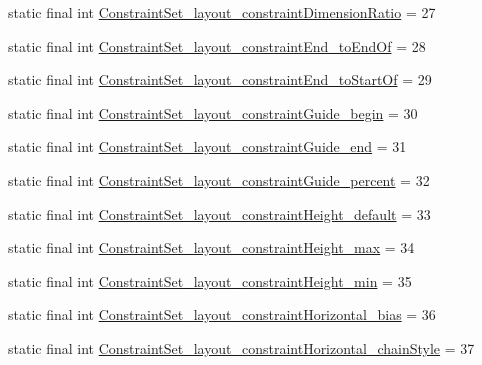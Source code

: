 \begin{DoxyCompactItemize}
\item 
static final int \mbox{\hyperlink{classandroid_1_1support_1_1constraint_1_1R_1_1styleable_a007c70f1158cd29d299c5eaf7c45eb8a}{Constraint\+Set\+\_\+layout\+\_\+constraint\+Dimension\+Ratio}} = 27
\item 
static final int \mbox{\hyperlink{classandroid_1_1support_1_1constraint_1_1R_1_1styleable_a65c534980499946880dea8ac1d597702}{Constraint\+Set\+\_\+layout\+\_\+constraint\+End\+\_\+to\+End\+Of}} = 28
\item 
static final int \mbox{\hyperlink{classandroid_1_1support_1_1constraint_1_1R_1_1styleable_a5a2dff95d8c4b48b895c5f1985dcb24c}{Constraint\+Set\+\_\+layout\+\_\+constraint\+End\+\_\+to\+Start\+Of}} = 29
\item 
static final int \mbox{\hyperlink{classandroid_1_1support_1_1constraint_1_1R_1_1styleable_a0ea403c2623f157080dd7066e51fe22f}{Constraint\+Set\+\_\+layout\+\_\+constraint\+Guide\+\_\+begin}} = 30
\item 
static final int \mbox{\hyperlink{classandroid_1_1support_1_1constraint_1_1R_1_1styleable_a1adcedbf3b9511840a0e4fe0f1f429e8}{Constraint\+Set\+\_\+layout\+\_\+constraint\+Guide\+\_\+end}} = 31
\item 
static final int \mbox{\hyperlink{classandroid_1_1support_1_1constraint_1_1R_1_1styleable_abadac67bcbd0c4b7ba1925aa772977db}{Constraint\+Set\+\_\+layout\+\_\+constraint\+Guide\+\_\+percent}} = 32
\item 
static final int \mbox{\hyperlink{classandroid_1_1support_1_1constraint_1_1R_1_1styleable_a3224fe6e88d5fdc425f9f3008268d016}{Constraint\+Set\+\_\+layout\+\_\+constraint\+Height\+\_\+default}} = 33
\item 
static final int \mbox{\hyperlink{classandroid_1_1support_1_1constraint_1_1R_1_1styleable_a38fb033c1f63e5e4e17ee0113f01277e}{Constraint\+Set\+\_\+layout\+\_\+constraint\+Height\+\_\+max}} = 34
\item 
static final int \mbox{\hyperlink{classandroid_1_1support_1_1constraint_1_1R_1_1styleable_a3fceaf339114082d7362d00848ceb7ad}{Constraint\+Set\+\_\+layout\+\_\+constraint\+Height\+\_\+min}} = 35
\item 
static final int \mbox{\hyperlink{classandroid_1_1support_1_1constraint_1_1R_1_1styleable_afd3f3354948096e74d195df32f2e4896}{Constraint\+Set\+\_\+layout\+\_\+constraint\+Horizontal\+\_\+bias}} = 36
\item 
static final int \mbox{\hyperlink{classandroid_1_1support_1_1constraint_1_1R_1_1styleable_a9274c3ecb89e7a1b8bc720f54212d55d}{Constraint\+Set\+\_\+layout\+\_\+constraint\+Horizontal\+\_\+chain\+Style}} = 37

\end{DoxyCompactItemize}
